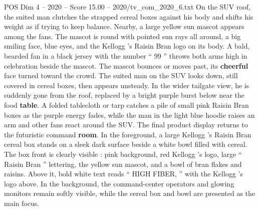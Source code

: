 \begin{textsample}{POS Dim 4 – 2020 – Score 15.00 – 2020/tv\_com\_2020\_6.txt}
On the SUV roof, the suited man clutches the strapped cereal boxes against his body and shifts his weight as if trying to keep balance.
Nearby, a large yellow sun mascot appears among the fans.
The mascot is round with pointed sun rays all around, a big smiling face, blue eyes, and the Kellogg ’s Raisin Bran logo on its body.
A bald, bearded fan in a black jersey with the number “ 99 ” throws both arms high in celebration beside the mascot.
The mascot bounces or moves past, its \textbf{cheerful} face turned toward the crowd.
The suited man on the SUV looks down, still covered in cereal boxes, then appears unsteady.
In the wider tailgate view, he is suddenly gone from the roof, replaced by a bright purple burst below near the food \textbf{table}.
A folded tablecloth or tarp catches a pile of small pink Raisin Bran boxes as the purple energy fades, while the man in the light blue hoodie raises an arm and other fans react around the SUV.
The final product display returns to the futuristic command \textbf{room}.
In the foreground, a large Kellogg ’s Raisin Bran cereal box stands on a sleek dark surface beside a white bowl filled with cereal.
The box front is clearly visible : pink background, red Kellogg ’s logo, large “ Raisin Bran ” lettering, the yellow sun mascot, and a bowl of bran flakes and raisins.
Above it, bold white text reads “ HIGH FIBER, ” with the Kellogg ’s logo above.
In the background, the command-center operators and glowing monitors remain softly visible, while the cereal box and bowl are presented as the main focus.

\end{textsample}
